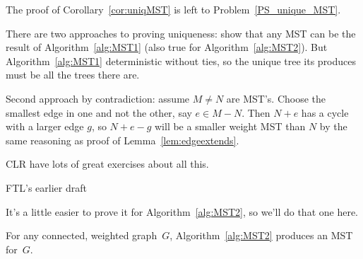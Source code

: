 The proof of Corollary~\ref{cor:uniqMST} is left to Problem~\ref{PS_unique_MST}.

\begin{editingnotes}

  There are two approaches to proving uniqueness: show that any MST can be
  the result of Algorithm~\ref{alg:MST1} (also true for
  Algorithm~\ref{alg:MST2}).  But Algorithm~\ref{alg:MST1} deterministic
  without ties, so the unique tree its produces must be all the trees
  there are.

  Second approach by contradiction: assume $M \neq N$ are MST's.  Choose
  the smallest edge in one and not the other, say $e \in M-N$.  Then $N+e$
  has a cycle with a larger edge $g$, so $N+e-g$ will be a smaller weight
  MST than $N$ by the same reasoning as proof of
  Lemma~\ref{lem:edgeextends}.
\end{editingnotes}

\begin{editingnotes}
  CLR have lots of great exercises about all this.
\end{editingnotes}

\iffalse  FTL's earlier draft

It's a little easier
to prove it for Algorithm~\ref{alg:MST2}, so we'll do that one here.

\begin{theorem}\label{thm:MST2}
For any connected, weighted graph~$G$, Algorithm~\ref{alg:MST2}
produces an MST for~$G$.
\end{theorem}

